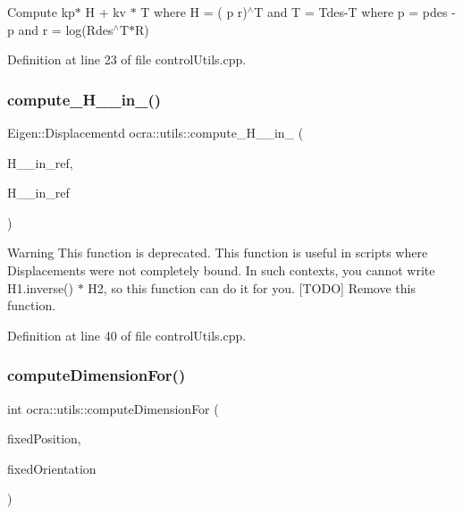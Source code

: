 Compute kp$\ast$ H + kv $\ast$  T where  H = ( p  r)$^\wedge$T and  T = Tdes-\/T where  p = pdes -\/ p and  r = log(\+Rdes$^\wedge$\+T$\ast$\+R) 

Definition at line 23 of file control\+Utils.\+cpp.

\hypertarget{namespaceocra_1_1utils_a9158ce8ea082d7620fd3204979c75c09}{}\label{namespaceocra_1_1utils_a9158ce8ea082d7620fd3204979c75c09} 
\subsubsection{\texorpdfstring{compute\+\_\+\+H\+\_\+\_\+in\+\_()}{compute\_H\_2\_in\_1()}}
{\footnotesize\ttfamily Eigen\+::\+Displacementd ocra\+::utils\+::compute\+\_\+\+H\+\_\+\_\+in\+\_ (\begin{DoxyParamCaption}\item[{const Eigen\+::\+Displacementd \&}]{H\+\_\+\_\+in\+\_\+ref,  }\item[{const Eigen\+::\+Displacementd \&}]{H\+\_\+\_\+in\+\_\+ref }\end{DoxyParamCaption})}

\begin{DoxyWarning}{Warning}
This function is deprecated. This function is useful in scripts where Displacements were not completely bound. In such contexts, you cannot write H1.\+inverse() $\ast$ H2, so this function can do it for you. \mbox{[}T\+O\+DO\mbox{]} Remove this function. 
\end{DoxyWarning}


Definition at line 40 of file control\+Utils.\+cpp.

\hypertarget{namespaceocra_1_1utils_abf6a0e8241cd263067cbf1c434952a01}{}\label{namespaceocra_1_1utils_abf6a0e8241cd263067cbf1c434952a01} 
\subsubsection{\texorpdfstring{compute\+Dimension\+For()}{computeDimensionFor()}\hspace{0.1cm}{\footnotesize\ttfamily [1/2]}}
{\footnotesize\ttfamily int ocra\+::utils\+::compute\+Dimension\+For (\begin{DoxyParamCaption}\item[{\hyperlink{namespaceocra_a436781c7059a0f76027df1c652126260}{E\+Cartesian\+Dof}}]{fixed\+Position,  }\item[{\hyperlink{namespaceocra_a436781c7059a0f76027df1c652126260}{E\+Cartesian\+Dof}}]{fixed\+Orientation }\end{DoxyParamCaption})\hspace{0.3cm}{\ttfamily [inline]}}



